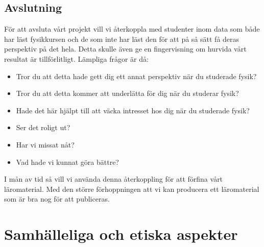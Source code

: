 \documentclass[12pt,a4paper]{article}
\begin{document}

\subsection{Avslutning}

För att avsluta vårt projekt vill vi återkoppla med studenter inom data som både har läst fysikkursen och de som inte har läst den för att på så sätt få deras perspektiv på det hela. Detta skulle även ge en fingervisning om hurvida vårt resultat är tillförlitligt. Lämpliga frågor är då:

\begin{itemize}
    \item Tror du att detta hade gett dig ett annat perspektiv när du studerade fysik?
    \item Tror du att detta kommer att underlätta för dig när du studerar fysik?
    \item Hade det här hjälpt till att väcka intresset hos dig när du studerade fysik?
    \item Ser det roligt ut?
    \item Har vi missat nåt?
    \item Vad hade vi kunnat göra bättre?
\end{itemize}

I mån av tid så vill vi använda denna återkoppling för att förfina vårt läromaterial. Med den större förhoppningen att vi kan producera ett läromaterial som är bra nog för att publiceras.

\section{Samhälleliga och etiska aspekter}
\end{document}
